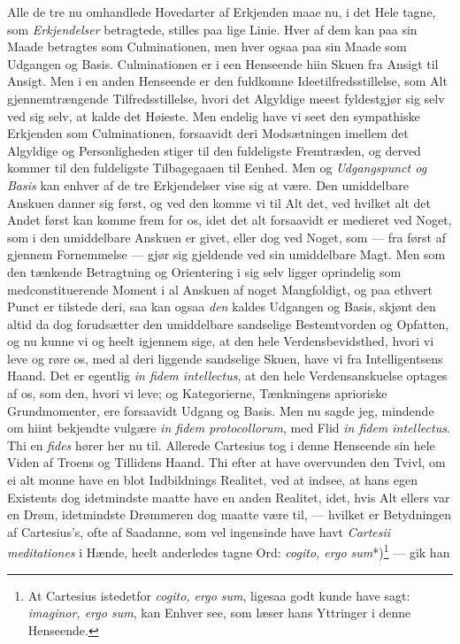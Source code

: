 \documentclass[12pt,a4paper]{book}
\newcommand{\apage}[1]{\marginnote{\footnotesize\textit{[#1]}}}
\begin{document}
Alle de tre nu omhandlede Hovedarter af Erkjenden maae nu, i det Hele tagne,
som \emph{Erkjendelser} betragtede, stilles paa lige Linie. Hver af dem kan paa sin
Maade betragtes som Culminationen, men hver ogsaa paa sin Maade som Udgangen
og Basis. Culminationen er i een Henseende hiin Skuen fra Ansigt til Ansigt.
Men i en anden Henseende er den fuldkomne Ideetilfredsstillelse, som Alt
gjennemtrængende Tilfredsstillelse, hvori det Algyldige meest fyldestgjør sig
selv ved sig selv, at kalde det Høieste. Men endelig have vi seet den
sympathiske Erkjenden som Culminationen, forsaavidt deri Modsætningen imellem
det Algyldige og Personligheden stiger til den fuldeligste Fremtræden, og
derved kommer til den fuldeligste Tilbagegaaen til Eenhed. Men og
\emph{Udgangspunct og Basis} kan enhver af de tre Erkjendelser vise sig at være. Den
umiddelbare Anskuen danner sig først, og ved den komme vi til Alt det, ved
hvilket alt det Andet først kan komme frem for os, idet det alt forsaavidt er
medieret ved Noget, som i den umiddelbare Anskuen er givet, eller dog ved
Noget, som --- fra først af gjennem Fornemmelse --- gjør sig gjeldende ved sin
umiddelbare Magt. Men som den tænkende Betragtning og Orientering i sig selv
ligger oprindelig som medconstituerende Moment i al Anskuen af noget
\apage{113} Mangfoldigt, og paa ethvert Punct er tilstede deri, saa kan ogsaa \emph{den} kaldes
Udgangen og Basis, skjønt den altid da dog forudsætter den umiddelbare
sandselige Bestemtvorden og Opfatten, og nu kunne vi og heelt igjennem sige,
at den hele Verdensbevidsthed, hvori vi leve og røre os, med al deri liggende
sandselige Skuen, have vi fra Intelligentsens Haand. Det er egentlig
\textit{in fidem intellectus}, at den hele Verdensanskuelse optages af os, som
den, hvori vi leve; og Kategorierne, Tænkningens aprioriske Grundmomenter, ere
forsaavidt Udgang og Basis. Men nu sagde jeg, mindende om hiint bekjendte
vulgære \textit{in fidem protocollorum}, med Flid \textit{in fidem
intellectus}. Thi en \textit{fides} hører her nu til. Allerede Cartesius tog i denne
Henseende sin hele Viden af Troens og Tillidens Haand. Thi efter at have
overvunden den Tvivl, om ei alt monne have en blot Indbildnings Realitet, ved
at indsee, at hans egen Existents dog idetmindste maatte have en anden
Realitet, idet, hvis Alt ellers var en Drøm, idetmindste Drømmeren dog maatte
være til, --- hvilket er Betydningen af Cartesius's, ofte af Saadanne, som vel
ingensinde have havt \textit{Cartesii meditationes} i Hænde, heelt anderledes
tagne Ord: \textit{cogito, ergo sum}*)\footnote{At Cartesius istedetfor
\textit{cogito, ergo sum}, ligesaa godt kunde have sagt: \textit{imaginor, ergo
sum}, kan Enhver see, som læser hans Yttringer i denne Henseende.} --- gik han
\end{document}

